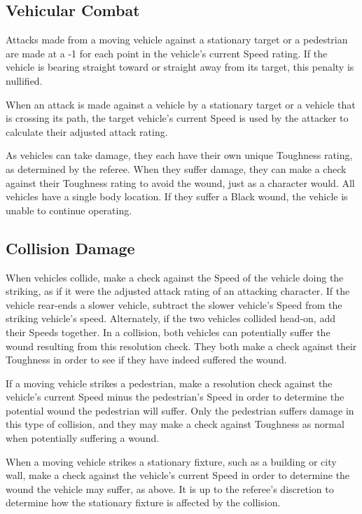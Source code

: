 \documentclass[oneside]{book}
\begin{document}
\begin{multicols}{2}
\subsection{Vehicular Combat}
Attacks made from a moving vehicle against a stationary target or a pedestrian are made at a -1 for each point in the vehicle's current Speed rating. If the vehicle is bearing straight toward or straight away from its target, this penalty is nullified. 

When an attack is made against a vehicle by a stationary target or a vehicle that is crossing its path, the target vehicle's current Speed is used by the attacker to calculate their adjusted attack rating. 

As vehicles can take damage, they each have their own unique Toughness rating, as determined by the referee. When they suffer damage, they can make a check against their Toughness rating to avoid the wound, just as a character would. All vehicles have a single body location. If they suffer a Black wound, the vehicle is unable to continue operating. 

\subsection{Collision Damage}

When vehicles collide, make a check against the Speed of the vehicle doing the striking, as if it were the adjusted attack rating of an attacking character. If the vehicle rear-ends a slower vehicle, subtract the slower vehicle's Speed from the striking vehicle's speed. Alternately, if the two vehicles collided head-on, add their Speeds together. In a collision, both vehicles can potentially suffer the wound resulting from this resolution check. They both make a check against their Toughness in order to see if they have indeed suffered the wound. 

If a moving vehicle strikes a pedestrian, make a resolution check against the vehicle's current Speed minus the pedestrian's Speed in order to determine the potential wound the pedestrian will suffer. Only the pedestrian suffers damage in this type of collision, and they may make a check against Toughness as normal when potentially suffering a wound. 

When a moving vehicle strikes a stationary fixture, such as a building or city wall, make a check against the vehicle's current Speed in order to determine the wound the vehicle may suffer, as above. It is up to the referee's discretion to determine how the stationary fixture is affected by the collision. 


\end{multicols}
\end{document}
